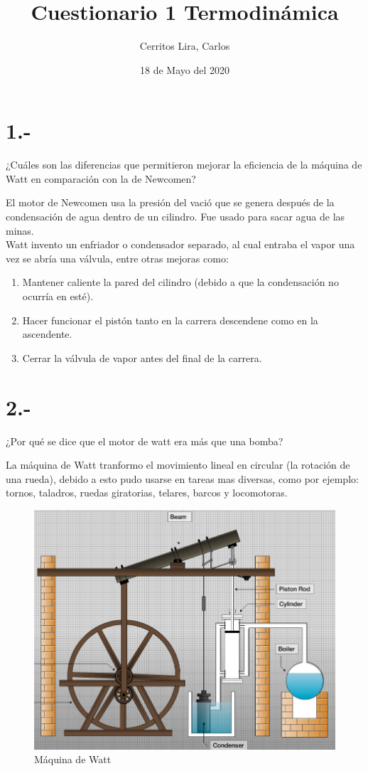 \documentclass{article}
\title{Cuestionario 1 Termodinámica}
\author{Cerritos Lira, Carlos}
\date{18 de Mayo del 2020}
\begin{document}
\maketitle
\section*{1.-}
¿Cuáles son las diferencias que permitieron mejorar la eficiencia de la máquina de Watt en 
comparación con la de Newcomen?
\begin{tcolorbox}[breakable]
    El motor de Newcomen usa la presión del vació que se genera después de la condensación 
    de agua dentro de un cilindro. Fue usado para sacar agua de las minas. \\
    Watt invento un enfriador o condensador separado, al cual entraba el vapor una vez se abría 
    una válvula, entre otras mejoras como:
    \begin{enumerate}
        \item Mantener caliente la pared del cilindro (debido a que la condensación no ocurría en esté).
        \item Hacer funcionar el pistón tanto en la carrera descendene como en la ascendente.
        \item Cerrar la válvula de vapor antes del final de la carrera.
    \end{enumerate}
    \end{tcolorbox}

\section*{2.-}
¿Por qué se dice que el motor de watt era más que una bomba?
\begin{tcolorbox}[breakable]
    La máquina de Watt tranformo el movimiento lineal en circular (la rotación de una rueda),
    debido a esto pudo usarse en tareas mas diversas, como por ejemplo: tornos, taladros, 
    ruedas giratorias, telares, barcos y locomotoras.
    \begin{figure}[H]
        \centering
        \includegraphics[scale=0.35]{images/p2_watt.png}
        \caption{Máquina de Watt}
        \label{}
    \end{figure}
\end{tcolorbox}
\end{document}
